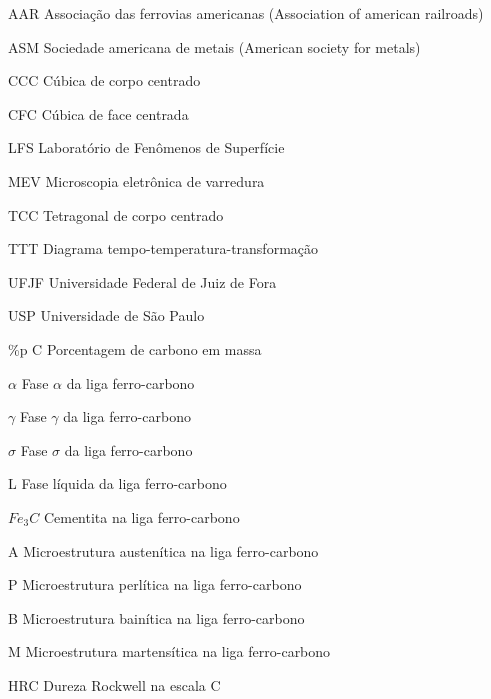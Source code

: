 \documentclass[
12pt,
openany, %
oneside, %
a4paper,			
english,			
brazil			        %
]{abntbibufjf}
\begin{document}
	\begin{siglas} %
		\item[AAR] Associação das ferrovias americanas (Association of american railroads)
		\item[ASM] Sociedade americana de metais (American society for metals)
		\item[CCC] Cúbica de corpo centrado
		\item[CFC] Cúbica de face centrada
		\item[LFS] Laboratório de Fenômenos de Superfície
		\item[MEV] Microscopia eletrônica de varredura
		\item[TCC] Tetragonal de corpo centrado
		\item[TTT] Diagrama tempo-temperatura-transformação
		\item[UFJF] Universidade Federal de Juiz de Fora
		\item[USP] Universidade de São Paulo


		
		
	\end{siglas}
	
	\begin{simbolos} %
		\item [\%p C] Porcentagem de carbono em massa
		\item [$\alpha$] Fase $\alpha$ da liga ferro-carbono
		\item [$\gamma$] Fase $\gamma$ da liga ferro-carbono
		\item [$\sigma$] Fase $\sigma$ da liga ferro-carbono
		\item [L] Fase líquida da liga ferro-carbono
		\item [$Fe_3C$] Cementita na liga ferro-carbono
		\item [A] Microestrutura austenítica na liga ferro-carbono
		\item [P] Microestrutura perlítica na liga ferro-carbono
		\item [B] Microestrutura bainítica na liga ferro-carbono
		\item [M] Microestrutura martensítica na liga ferro-carbono
		\item [HRC] Dureza Rockwell na escala C
		
		
	
	\end{simbolos}  
	
\end{document}

